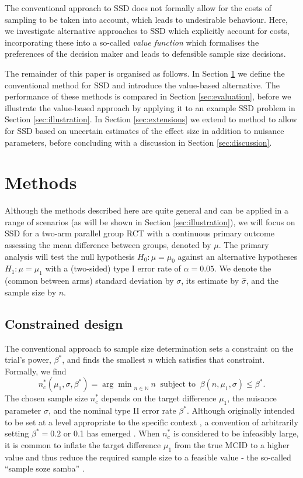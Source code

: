 \documentclass[sagev, Crown]{sagej}
\begin{document}
The conventional approach to SSD does not formally allow for the costs of sampling to be taken into account, which leads to undesirable behaviour. Here, we investigate alternative approaches to SSD which explicitly account for costs, incorporating these into a so-called \emph{value function} which formalises the preferences of the decision maker and leads to defensible sample size decisions.

The remainder of this paper is organised as follows. In Section \ref{sec:methods} we define the conventional method for SSD and introduce the value-based alternative. The performance of these methods is compared in Section \ref{sec:evaluation}, before we illustrate the value-based approach by applying it to an example SSD problem in Section \ref{sec:illustration}. In Section \ref{sec:extensions} we extend to method to allow for SSD based on uncertain estimates of the effect size in addition to nuisance parameters, before concluding with a discussion in Section \ref{sec:discussion}.

\section{Methods}\label{sec:methods}

Although the methods described here are quite general and can be applied in a range of scenarios (as will be shown in Section \ref{sec:illustration}), we will focus on SSD for a two-arm parallel group RCT with a continuous primary outcome assessing the mean difference between groups, denoted by $\mu$. The primary analysis will test the null hypothesis $H_0: \mu = \mu_0$ against an alternative hypotheses $H_1: \mu = \mu_1$ with a (two-sided) type I error rate of $\alpha = 0.05$. We denote the (common between arms) standard deviation by $\sigma$, its estimate by $\hat{\sigma}$, and the sample size by $n$.

\subsection{Constrained design}

The conventional approach to sample size determination sets a constraint on the trial's power, $\beta^*$, and finds the smallest $n$ which satisfies that constraint. Formally, we find
\begin{equation}
n^*_c (\mu_1, \sigma, \beta^*) = {\arg\min}_{n \in \mathbb{N}}~ n ~\text{ subject to } ~ \beta(n, \mu_1, \sigma) \leq \beta^*.
\end{equation}
The chosen sample size $n^*_c$ depends on the target difference $\mu_1$, the nuisance parameter $\sigma$, and the nominal type II error rate $\beta^*$. Although originally intended to be set at a level appropriate to the specific context \cite{Neyman1933}, a convention of arbitrarily setting $\beta^* = 0.2$ or 0.1 has emerged \cite{Bacchetti2019}. When $n^*_c$ is considered to be infeasibly large, it is common to inflate the target difference $\mu_1$ from the true MCID to a higher value and thus reduce the required sample size to a feasible value - the so-called ``sample soze samba'' \cite{Schulz2005}.
\end{document}
